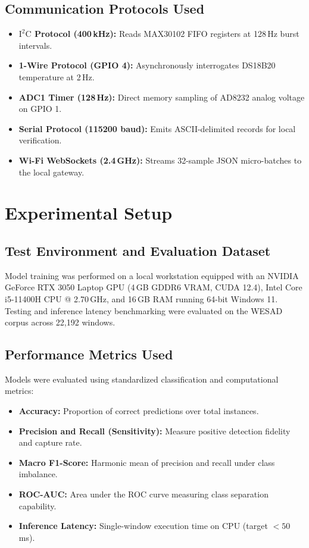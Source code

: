\documentclass[11pt,a4paper]{article}
\begin{document}
\subsection{Communication Protocols Used}
\begin{itemize}
    \item \textbf{$\text{I}^2\text{C}$ Protocol (400\,kHz):} Reads MAX30102 FIFO registers at 128\,Hz burst intervals.
    \item \textbf{1-Wire Protocol (GPIO 4):} Asynchronously interrogates DS18B20 temperature at 2\,Hz.
    \item \textbf{ADC1 Timer (128\,Hz):} Direct memory sampling of AD8232 analog voltage on GPIO 1.
    \item \textbf{Serial Protocol (115200 baud):} Emits ASCII-delimited records for local verification.
    \item \textbf{Wi-Fi WebSockets (2.4\,GHz):} Streams 32-sample JSON micro-batches to the local gateway.
\end{itemize}

\section{Experimental Setup}

\subsection{Test Environment and Evaluation Dataset}
Model training was performed on a local workstation equipped with an NVIDIA GeForce RTX 3050 Laptop GPU (4\,GB GDDR6 VRAM, CUDA 12.4), Intel Core i5-11400H CPU @ 2.70\,GHz, and 16\,GB RAM running 64-bit Windows 11. Testing and inference latency benchmarking were evaluated on the WESAD corpus across 22,192 windows.

\subsection{Performance Metrics Used}
Models were evaluated using standardized classification and computational metrics:
\begin{itemize}
    \item \textbf{Accuracy:} Proportion of correct predictions over total instances.
    \item \textbf{Precision and Recall (Sensitivity):} Measure positive detection fidelity and capture rate.
    \item \textbf{Macro F1-Score:} Harmonic mean of precision and recall under class imbalance.
    \item \textbf{ROC-AUC:} Area under the ROC curve measuring class separation capability.
    \item \textbf{Inference Latency:} Single-window execution time on CPU (target $< 50$\,ms).
\end{itemize}
\end{document}
